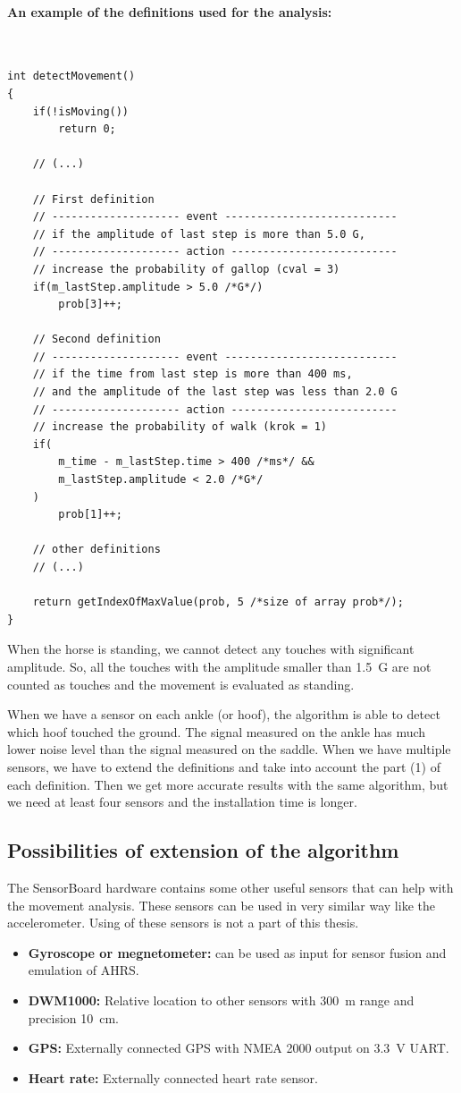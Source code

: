 \paragraph{An example of the definitions used for the analysis:} \quad\\
\Cpp
\begin{lstlisting}
int detectMovement()
{
	if(!isMoving())
		return 0;
	
	// (...)
	
	// First definition
	// -------------------- event ---------------------------
	// if the amplitude of last step is more than 5.0 G,
	// -------------------- action --------------------------
	// increase the probability of gallop (cval = 3)
	if(m_lastStep.amplitude > 5.0 /*G*/)
		prob[3]++;
	
	// Second definition
	// -------------------- event ---------------------------
	// if the time from last step is more than 400 ms,
	// and the amplitude of the last step was less than 2.0 G
	// -------------------- action --------------------------
	// increase the probability of walk (krok = 1)
	if(
		m_time - m_lastStep.time > 400 /*ms*/ &&
		m_lastStep.amplitude < 2.0 /*G*/
	)
		prob[1]++;
	
	// other definitions
	// (...)
	
	return getIndexOfMaxValue(prob, 5 /*size of array prob*/);
}
\end{lstlisting}

When the horse is standing, we cannot detect any touches with significant amplitude. So, all the touches with the amplitude smaller than \SI{1.5}{G} are not counted as touches and the movement is evaluated as standing.

When we have a sensor on each ankle (or hoof), the algorithm is able to detect which hoof touched the ground. The signal measured on the ankle has much lower noise level than the signal measured on the saddle. When we have multiple sensors, we have to extend the definitions and take into account the part (1) of each definition. Then we get more accurate results with the same algorithm, but we need at least four sensors and the installation time is longer.

\subsection{Possibilities of extension of the algorithm}
The SensorBoard hardware contains some other useful sensors that can help with the movement analysis. These sensors can be used in very similar way like the accelerometer. Using of these sensors is not a part of this thesis.
\begin{itemize}
	\item \textbf{Gyroscope or megnetometer:} can be used as input for sensor fusion and emulation of \ac{AHRS}.
	\item \textbf{DWM1000:} Relative location to other sensors with \SI{300}{m} range and precision \SI{10}{cm}.
	\item \textbf{GPS:} Externally connected GPS with NMEA 2000 output on \SI{3.3}{V} \ac{UART}.
	\item \textbf{Heart rate:} Externally connected heart rate sensor.
\end{itemize}

